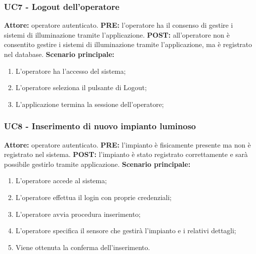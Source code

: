 \documentclass[a4paper, 12pt]{article}
\begin{document}
\subsubsection{UC7 - Logout dell'operatore}
\textbf{Attore:} operatore autenticato.\newline
\textbf{PRE:} l'operatore ha il consenso di gestire i sistemi di illuminazione tramite l'applicazione.\newline
\textbf{POST:} all'operatore non è consentito gestire i sistemi di illuminazione tramite l'applicazione, ma è registrato nel database.\newline
\textbf{Scenario principale:}
\begin{enumerate}
    \item L'operatore ha l'accesso del sistema;
    \item L'operatore seleziona il pulsante di Logout;
    \item L'applicazione termina la sessione dell'operatore;
\end{enumerate}

\subsubsection{UC8 - Inserimento di nuovo impianto luminoso}
\textbf{Attore:} operatore autenticato.\newline
\textbf{PRE:} l'impianto è fisicamente presente ma non è registrato nel sistema.\newline
\textbf{POST:} l'impianto è stato registrato correttamente e sarà possibile gestirlo tramite applicazione.\newline
\textbf{Scenario principale:}
\begin{enumerate}
    \item L'operatore accede al sistema;
    \item L'operatore effettua il login con proprie credenziali;
    \item L'operatore avvia procedura inserimento;
    \item L'operatore specifica il sensore che gestirà l'impianto e i relativi dettagli;
    \item Viene ottenuta la conferma dell'inserimento.
\end{enumerate}
\end{document}
